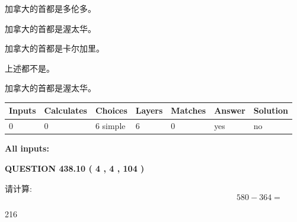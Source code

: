 \documentclass{ctexart}
\begin{document}
 
加拿大的首都是多伦多。
 
 
加拿大的首都是渥太华。
 
 
加拿大的首都是卡尔加里。
 
 
 上述都不是。
 
 
\noindent{}
 
 
加拿大的首都是渥太华。
 
 
\noindent{}
 
 
   
   
   
   
\noindent\begin{tabular}{|l|l|l|l|l|l|l|}
 \hline
Inputs & Calculates & Choices & Layers & Matches & Answer & Solution \\ \hline
 0  & 
 0  & 
 6
  simple  
  & 
 6  & 
 0  & 
  yes & 
  no 
  \\ \hline
 \end{tabular}
   
   
   
   
\noindent{}
   
   
   
   
\noindent\vspace{0.1in}\hspace{-0.08in} {\textbf{\Large{All inputs: }}}
   
   
  
\vspace{0.2in}
  
{\textbf{\Large{QUESTION
438.10 
 ( 4 , 4 , 104 )
}}}
  
  
 
请计算:
\begin{equation}
580 -   %
364 = \nonumber
\end{equation}
 
 
 
\noindent{}
 
 

216
 
 
\noindent{}
 
\end{document}
